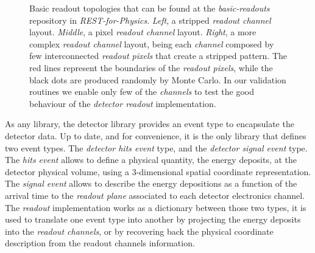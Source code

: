 \begin{figure}[htb!]
  \centering
	\caption{Basic readout topologies that can be found at the \emph{basic-readouts} repository in \emph{REST-for-Physics}. \emph{Left}, a stripped \emph{readout channel} layout. \emph{Middle}, a pixel \emph{readout channel} layout. \emph{Right}, a more complex \emph{readout channel} layout, being each \emph{channel}  composed by few interconnected \emph{readout pixels} that create a stripped pattern. The red lines represent the boundaries of the \emph{readout pixels}, while the black dots are produced randomly by Monte Carlo. In our validation routines we enable only few of the \emph{channels} to test the good behaviour of the \emph{detector readout} implementation.  }\label{fig:readouts}
\end{figure}

As any library, the detector library provides an event type to encapsulate the detector data. Up to date, and for convenience, it is the only library that defines two event types. The \emph{detector hits event} type, and the \emph{detector signal event} type. The \emph{hits event} allows to define a physical quantity, the energy deposits, at the detector physical volume, using a 3-dimensional spatial coordinate representation. The \emph{signal event} allows to describe the energy depositions as a function of the arrival time to the \emph{readout plane} associated to each detector electronics channel. The \emph{readout} implementation works as a dictionary between those two types, it is used to translate one event type into another by projecting the energy deposits into the \emph{readout channels}, or by recovering back the physical coordinate description from the readout channels information.

